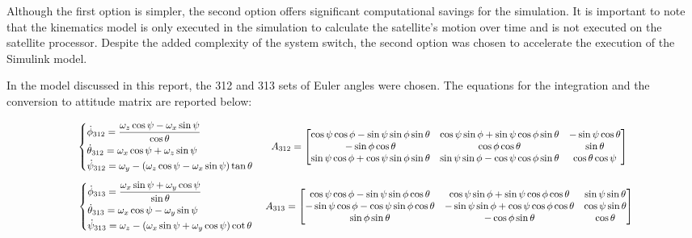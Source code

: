 Although the first option is simpler, the second option offers significant computational savings for the simulation. It is important to note that the kinematics model is only executed in the simulation to calculate the satellite's motion over time and is not executed on the satellite processor. Despite the added complexity of the system switch, the second option was chosen to accelerate the execution of the Simulink model.

In the model discussed in this report, the 312 and 313 sets of Euler angles were chosen. The equations for the integration and the conversion to attitude matrix are reported below:

\vspace{-10pt}
\begin{equation}
    \scalebox{0.88}{
    \begin{tabular}{c c}
        $\begin{dcases}
            \dot{\phi}_{312} = \frac{\omega_z \cos \psi - \omega_x \sin \psi}{\cos \theta} \\
            \dot{\theta}_{312} = \omega_x \cos \psi + \omega_z \sin \psi \\
            \dot{\psi}_{312} = \omega_y - \left( \omega_z \cos \psi - \omega_x \sin \psi \right) \tan \theta
        \end{dcases}$
        &
        $A_{312} =
        \begin{bmatrix}
            \cos \psi \cos \phi - \sin \psi \sin \phi \sin \theta &
            \cos \psi \sin \phi + \sin \psi \cos \phi \sin \theta &
            -\sin \psi \cos \theta \\
            -\sin \phi \cos \theta & \cos \phi \cos \theta & \sin \theta \\
            \sin \psi \cos \phi + \cos \psi \sin \phi \sin \theta &
            \sin \psi \sin \phi - \cos \psi \cos \phi \sin \theta &
            \cos \theta \cos \psi
        \end{bmatrix}$
        \\[1cm]
        $\begin{dcases}
            \dot{\phi}_{313} = \frac{\omega_x \sin \psi + \omega_y \cos \psi}{\sin \theta} \\
            \dot{\theta}_{313} = \omega_x \cos \psi - \omega_y \sin \psi \\
            \dot{\psi}_{313} = \omega_z - \left( \omega_x \sin \psi + \omega_y \cos \psi \right) \cot \theta
        \end{dcases}$
        &
        $A_{313} =
        \begin{bmatrix}
            \cos \psi \cos \phi - \sin \psi \sin \phi \cos \theta &
            \cos \psi \sin \phi + \sin \psi \cos \phi \cos \theta &
            \sin \psi \sin \theta \\
            -\sin \psi \cos \phi - \cos \psi \sin \phi \cos \theta &
            -\sin \psi \sin \phi + \cos \psi \cos \phi \cos \theta &
            \cos \psi \sin \theta \\
            \sin \phi \sin \theta & -\cos \phi \sin \theta & \cos \theta
        \end{bmatrix}$
    \end{tabular}}
\end{equation}

